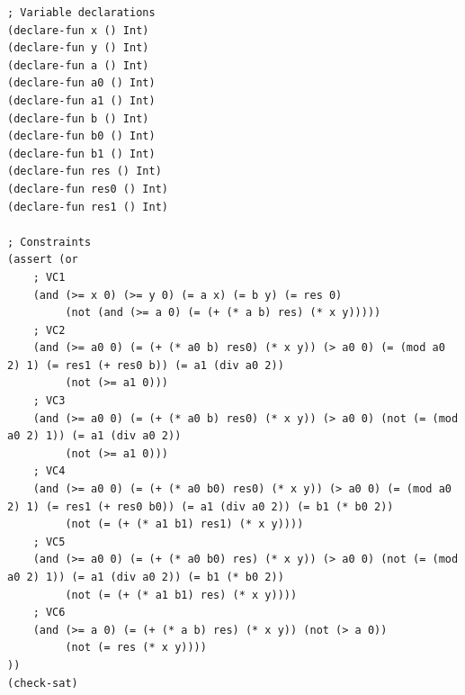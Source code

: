 \documentclass{article}
\begin{document}
\pagebreak

\scriptsize
\begin{verbatim}
; Variable declarations
(declare-fun x () Int)
(declare-fun y () Int)
(declare-fun a () Int)
(declare-fun a0 () Int)
(declare-fun a1 () Int)
(declare-fun b () Int)
(declare-fun b0 () Int)
(declare-fun b1 () Int)
(declare-fun res () Int)
(declare-fun res0 () Int)
(declare-fun res1 () Int)

; Constraints
(assert (or
    ; VC1
    (and (>= x 0) (>= y 0) (= a x) (= b y) (= res 0)
         (not (and (>= a 0) (= (+ (* a b) res) (* x y)))))
    ; VC2
    (and (>= a0 0) (= (+ (* a0 b) res0) (* x y)) (> a0 0) (= (mod a0 2) 1) (= res1 (+ res0 b)) (= a1 (div a0 2))
         (not (>= a1 0)))
    ; VC3
    (and (>= a0 0) (= (+ (* a0 b) res0) (* x y)) (> a0 0) (not (= (mod a0 2) 1)) (= a1 (div a0 2))
         (not (>= a1 0)))
    ; VC4
    (and (>= a0 0) (= (+ (* a0 b0) res0) (* x y)) (> a0 0) (= (mod a0 2) 1) (= res1 (+ res0 b0)) (= a1 (div a0 2)) (= b1 (* b0 2))
         (not (= (+ (* a1 b1) res1) (* x y))))
    ; VC5
    (and (>= a0 0) (= (+ (* a0 b0) res) (* x y)) (> a0 0) (not (= (mod a0 2) 1)) (= a1 (div a0 2)) (= b1 (* b0 2))
         (not (= (+ (* a1 b1) res) (* x y))))
    ; VC6
    (and (>= a 0) (= (+ (* a b) res) (* x y)) (not (> a 0))
         (not (= res (* x y))))
))
(check-sat)
\end{verbatim}
\end{document}
